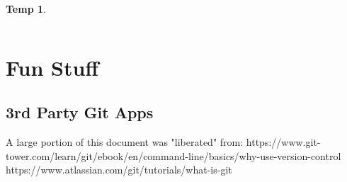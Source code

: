 \documentclass{article}
\begin{document}
 \newtheorem*{temp}{Temp}
 \begin{temp}
 \end{temp}
\begin{lstlisting}[language=bash]

\end{lstlisting}


\section{Fun Stuff}
\subsection{3rd Party Git Apps}



\begin{thebibliography}{9}
A large portion of this document was "liberated" from:
https://www.git-tower.com/learn/git/ebook/en/command-line/basics/why-use-version-control
https://www.atlassian.com/git/tutorials/what-is-git
\end{thebibliography}
\end{document}
